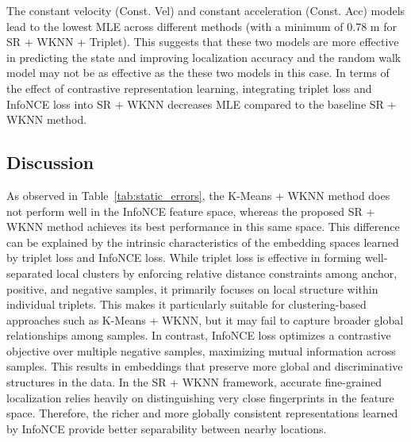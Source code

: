 \documentclass[journal,twoside,web]{ieeecolor}
\begin{document}
The constant velocity (Const. Vel) and constant acceleration (Const. Acc) models lead to the lowest MLE across different methods (with a minimum of 0.78 m for SR + WKNN + Triplet). This suggests that these two models are more effective in predicting the state and improving localization accuracy and the random walk model may not be as effective as the these two models in this case.
In terms of the effect of contrastive representation learning, integrating triplet loss and InfoNCE loss into SR + WKNN decreases MLE compared to the baseline SR + WKNN method.
\subsection{Discussion} 
\label{sec:disc}
As observed in Table~\ref{tab:static_errors}, the K-Means + WKNN method does not perform well in the InfoNCE feature space, whereas the proposed SR + WKNN method achieves its best performance in this same space. 
This difference can be explained by the intrinsic characteristics of the embedding spaces learned by triplet loss and InfoNCE loss. 
While triplet loss is effective in forming well-separated local clusters by enforcing relative distance constraints among anchor, positive, and negative samples, it primarily focuses on local structure within individual triplets. 
This makes it particularly suitable for clustering-based approaches such as K-Means + WKNN, but it may fail to capture broader global relationships among samples.
In contrast, InfoNCE loss optimizes a contrastive objective over multiple negative samples, maximizing mutual information across samples. 
This results in embeddings that preserve more global and discriminative structures in the data.
In the SR + WKNN framework, accurate fine-grained localization relies heavily on distinguishing very close fingerprints in the feature space. 
Therefore, the richer and more globally consistent representations learned by InfoNCE provide better separability between nearby locations. 
\end{document}
